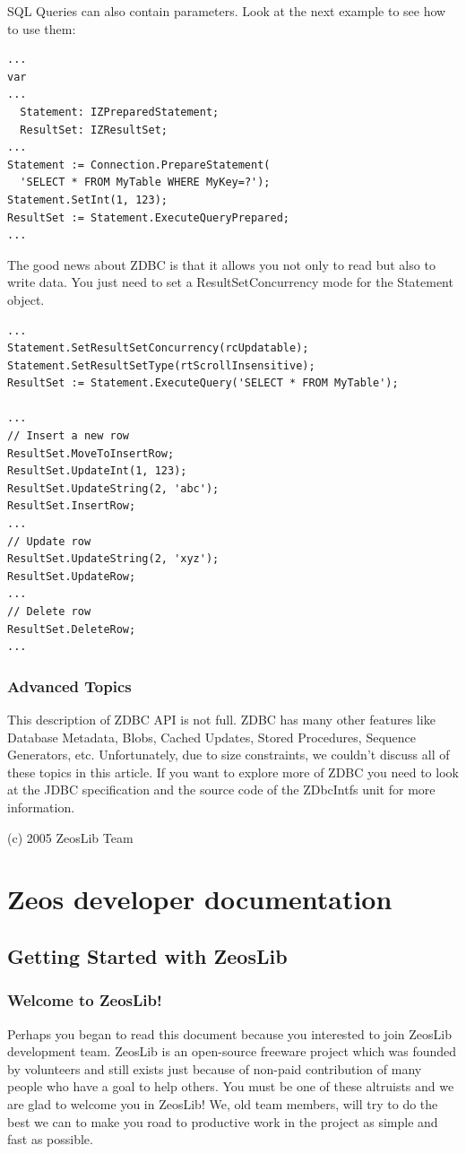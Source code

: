 \documentclass[a4paper,12pt,oneside]{book}
\begin{document}
SQL Queries can also contain parameters. Look at the next example to see how to use them:

\begin{verbatim}
...
var
...
  Statement: IZPreparedStatement;
  ResultSet: IZResultSet;
...
Statement := Connection.PrepareStatement(
  'SELECT * FROM MyTable WHERE MyKey=?');
Statement.SetInt(1, 123);
ResultSet := Statement.ExecuteQueryPrepared;
...
\end{verbatim}

The good news about ZDBC is that it allows you not only to read but also to write data.
You just need to set a ResultSetConcurrency mode for the Statement object.

\begin{verbatim}
...
Statement.SetResultSetConcurrency(rcUpdatable);
Statement.SetResultSetType(rtScrollInsensitive);
ResultSet := Statement.ExecuteQuery('SELECT * FROM MyTable');

...
// Insert a new row
ResultSet.MoveToInsertRow;
ResultSet.UpdateInt(1, 123);
ResultSet.UpdateString(2, 'abc');
ResultSet.InsertRow;
...
// Update row
ResultSet.UpdateString(2, 'xyz');
ResultSet.UpdateRow;
...
// Delete row
ResultSet.DeleteRow;
...
\end{verbatim}

\section{Advanced Topics}
This description of ZDBC API is not full.
ZDBC has many other features like Database Metadata, Blobs, Cached Updates, Stored Procedures, Sequence Generators, etc.
Unfortunately, due to size constraints, we couldn't discuss all of these topics in this article.
If you want to explore more of ZDBC you need to look at the JDBC specification and the source code of the ZDbcIntfs unit for more information.

(c) 2005 ZeosLib Team

\part{Zeos developer documentation}

\chapter{Getting Started with ZeosLib}
\section{Welcome to ZeosLib!}
Perhaps you began to read this document because you interested to join ZeosLib development team.
ZeosLib is an open-source freeware project which was founded by volunteers and still exists just because of non-paid contribution of many people who have a goal to help others.
You must be one of these altruists and we are glad to welcome you in ZeosLib!
We, old team members, will try to do the best we can to make you road to productive work in the project as simple and fast as possible.
\end{document}
